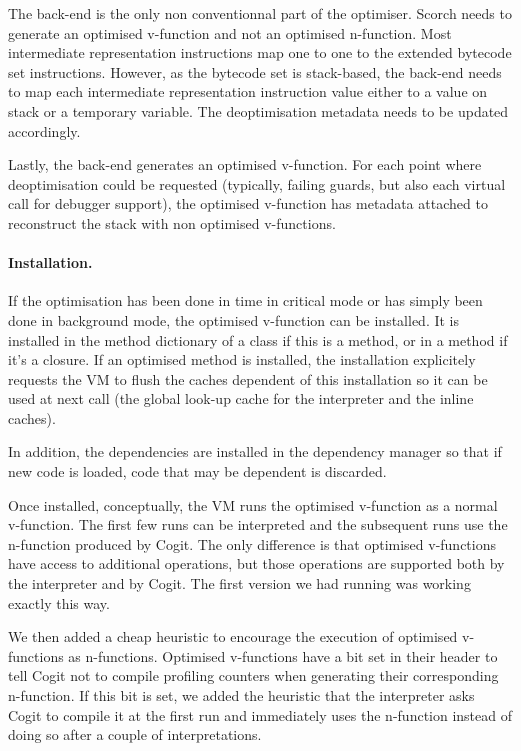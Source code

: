 \documentclass[a4paper,12pt,twoside]{../includes/ThesisStyle}
\begin{document}
The back-end is the only non conventionnal part of the optimiser. Scorch needs to generate an optimised v-function and not an optimised n-function. Most intermediate representation instructions map one to one to the extended bytecode set instructions. However, as the bytecode set is stack-based, the back-end needs to map each intermediate representation instruction value either to a value on stack or a temporary variable. The deoptimisation metadata needs to be updated accordingly.

Lastly, the back-end generates an optimised v-function. For each point where deoptimisation could be requested (typically, failing guards, but also each virtual call for debugger support), the optimised v-function has metadata attached to reconstruct the stack with non optimised v-functions.

\paragraph{Installation.}
If the optimisation has been done in time in critical mode or has simply been done in background mode, the optimised v-function can be installed. It is installed in the method dictionary of a class if this is a method, or in a method if it's a closure. If an optimised method is installed, the installation explicitely requests the VM to flush the caches dependent of this installation so it can be used at next call (the global look-up cache for the interpreter and the inline caches).

In addition, the dependencies are installed in the dependency manager so that if new code is loaded, code that may be dependent is discarded.

Once installed, conceptually, the VM runs the optimised v-function as a normal v-function. The first few runs can be interpreted and the subsequent runs use the n-function produced by Cogit. The only difference is that optimised v-functions have access to additional operations, but those operations are supported both by the interpreter and by Cogit. The first version we had running was working exactly this way.

We then added a cheap heuristic to encourage the execution of optimised v-functions as n-functions. Optimised v-functions have a bit set in their header to tell Cogit not to compile profiling counters when generating their corresponding n-function. If this bit is set, we added the heuristic that the interpreter asks Cogit to compile it at the first run and immediately uses the n-function instead of doing so after a couple of interpretations.
\end{document}
